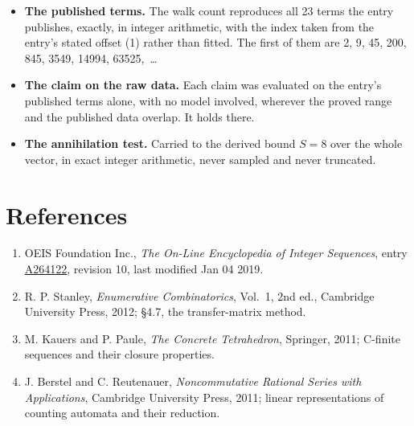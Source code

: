 \documentclass[11pt]{article}
\theoremstyle{definition}
\begin{document}
\begin{itemize}

\item {\bfseries The published terms.} The walk count reproduces all 23 terms the entry publishes, exactly, in integer arithmetic, with the index taken from the entry's stated offset (1) rather than fitted. The first of them are 2, 9, 45, 200, 845, 3549, 14994, 63525,~\dots

\item {\bfseries The claim on the raw data.} Each claim was evaluated on the entry's published terms alone, with no model involved, wherever the proved range and the published data overlap. It holds there.

\item {\bfseries The annihilation test.} Carried to the derived bound $S = 8$ over the whole vector, in exact integer arithmetic, never sampled and never truncated.

\end{itemize}

\section{References}

\begin{enumerate}

\item OEIS Foundation Inc., \emph{The On-Line Encyclopedia of Integer Sequences}, entry \href{https://oeis.org/A264122}{A264122}, revision 10, last modified Jan 04 2019.

\item R. P. Stanley, \emph{Enumerative Combinatorics}, Vol.~1, 2nd ed., Cambridge University Press, 2012; \S4.7, the transfer-matrix method.

\item M. Kauers and P. Paule, \emph{The Concrete Tetrahedron}, Springer, 2011; C-finite sequences and their closure properties.

\item J. Berstel and C. Reutenauer, \emph{Noncommutative Rational Series with Applications}, Cambridge University Press, 2011; linear representations of counting automata and their reduction.

\end{enumerate}
\end{document}
